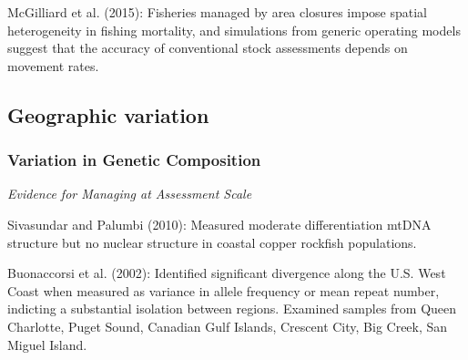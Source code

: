 \documentclass[11pt,
  english,
  a4paper,
]{article}
\begin{document}
\leavevmode\tagmcend\tagstructend\par


McGilliard et al. {(2015)\leavevmode\tagmcend\tagstructend}: Fisheries managed by area closures impose spatial heterogeneity in fishing mortality, and simulations from generic operating models suggest that the accuracy of conventional stock assessments depends on movement rates.

\leavevmode\tagmcend\tagstructend\par


\hypertarget{geographic-variation}{%
\subsection{Geographic variation}\label{geographic-variation}}

\leavevmode\tagmcend\tagstructend


\hypertarget{variation-in-genetic-composition}{%
\subsubsection{Variation in Genetic Composition}\label{variation-in-genetic-composition}}

\leavevmode\tagmcend\tagstructend


\emph{Evidence for Managing at Assessment Scale}

\leavevmode\tagmcend\tagstructend\par


Sivasundar and Palumbi {(2010)\leavevmode\tagmcend\tagstructend}: Measured moderate differentiation mtDNA structure but no nuclear structure in coastal copper rockfish populations.

\leavevmode\tagmcend\tagstructend\par


Buonaccorsi et al. {(2002)\leavevmode\tagmcend\tagstructend}: Identified significant divergence along the U.S. West Coast when measured as variance in allele frequency or mean repeat number, indicting a substantial isolation between regions. Examined samples from Queen Charlotte, Puget Sound, Canadian Gulf Islands, Crescent City, Big Creek, San Miguel Island.
\end{document}
